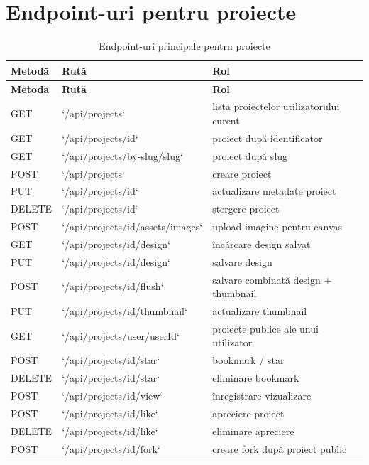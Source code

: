 \section{Endpoint-uri pentru proiecte}

\begin{longtable}{>{\RaggedRight\arraybackslash}p{2cm}>{\RaggedRight\arraybackslash}p{5.7cm}>{\RaggedRight\arraybackslash}p{6.2cm}}
  \caption{Endpoint-uri principale pentru proiecte} \\
  \toprule
  \textbf{Metodă} & \textbf{Rută} & \textbf{Rol} \\
  \midrule
  \endfirsthead
  \toprule
  \textbf{Metodă} & \textbf{Rută} & \textbf{Rol} \\
  \midrule
  \endhead
  GET & `/api/projects` & lista proiectelor utilizatorului curent \\
  GET & `/api/projects/{id}` & proiect după identificator \\
  GET & `/api/projects/by-slug/{slug}` & proiect după slug \\
  POST & `/api/projects` & creare proiect \\
  PUT & `/api/projects/{id}` & actualizare metadate proiect \\
  DELETE & `/api/projects/{id}` & ștergere proiect \\
  POST & `/api/projects/{id}/assets/images` & upload imagine pentru canvas \\
  GET & `/api/projects/{id}/design` & încărcare design salvat \\
  PUT & `/api/projects/{id}/design` & salvare design \\
  POST & `/api/projects/{id}/flush` & salvare combinată design + thumbnail \\
  PUT & `/api/projects/{id}/thumbnail` & actualizare thumbnail \\
  GET & `/api/projects/user/{userId}` & proiecte publice ale unui utilizator \\
  POST & `/api/projects/{id}/star` & bookmark / star \\
  DELETE & `/api/projects/{id}/star` & eliminare bookmark \\
  POST & `/api/projects/{id}/view` & înregistrare vizualizare \\
  POST & `/api/projects/{id}/like` & apreciere proiect \\
  DELETE & `/api/projects/{id}/like` & eliminare apreciere \\
  POST & `/api/projects/{id}/fork` & creare fork după proiect public \\
  \bottomrule
\end{longtable}

